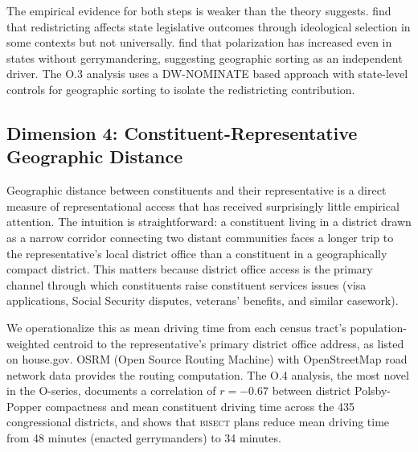 The empirical evidence for both steps is weaker than the theory suggests.
\citet{caugheyTausanovitch2017} find that redistricting affects state legislative
outcomes through ideological selection in some contexts but not universally.
\citet{mccarty2009} find that polarization has increased even in states without
gerrymandering, suggesting geographic sorting as an independent driver.
The O.3 analysis uses a DW-NOMINATE based approach with state-level controls
for geographic sorting to isolate the redistricting contribution.

\subsection{Dimension 4: Constituent-Representative Geographic Distance}

Geographic distance between constituents and their representative is a direct measure
of representational access that has received surprisingly little empirical attention.
The intuition is straightforward: a constituent living in a district drawn as a narrow
corridor connecting two distant communities faces a longer trip to the representative's
local district office than a constituent in a geographically compact district. This
matters because district office access is the primary channel through which constituents
raise constituent services issues (visa applications, Social Security disputes, veterans'
benefits, and similar casework).

We operationalize this as mean driving time from each census tract's population-weighted
centroid to the representative's primary district office address, as listed on house.gov.
OSRM (Open Source Routing Machine) with OpenStreetMap road network data provides the
routing computation. The O.4 analysis, the most novel in the O-series, documents a
correlation of $r = -0.67$ between district Polsby-Popper compactness and mean constituent
driving time across the 435 congressional districts, and shows that \textsc{bisect} plans
reduce mean driving time from 48 minutes (enacted gerrymanders) to 34 minutes.
